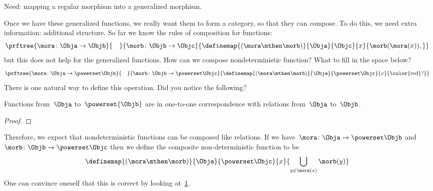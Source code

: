 Need: mapping a regular morphism into a generalized morphism.

Once we have these generalized functions, we really want them to form a category, so that they can compose.
To do this, we need extra information: additional structure.
So far we know the rules of composition for functions:
%
\begin{equation}
    \label{eq:monad-function-composition}
    \prftree{\mora\colon \Obja \to \Objb}{\quad}{\morb\colon \Objb \to \Objc}
    {\definemap{(\mora\mthen\morb)}{\Obja}{\Objc}%
        {x}{\morb(\mora(x)),}}
\end{equation}
%
but this does not help for the generalized functions.
How can we compose nondeterministic function?
What to fill in the space below?
%
\begin{equation}
    \label{eq:monad-gen-function-composition}
    \prftree{\mora\colon \Obja \to \powerset\Objb}{\quad}{\morb\colon \Objb \to \powerset \Objc}
    {\definemap{(\mora\mthen\morb)}{\Obja}{\powerset\Objc}%
        {x}{\text{\color{red}?}}}
\end{equation}
%
There is one natural way to define this operation.
Did you notice the following?

\begin{lemma}
    \label{lem:powersets-relations}
    Functions from~$\Obja$ to~$\powerset{\Objb}$ are in one-to-one correspondence with relations from~$\Obja$ to~$\Objb$.
\end{lemma}

\begin{proof}
\end{proof}

Therefore, we expect that nondeterministic functions can be composed like relations.
If we have~$\mora\colon \Obja \to \powerset\Objb$ and~$\morb\colon \Objb \to \powerset \Objc$ then we define the composite non-deterministic function to be
%
\begin{equation}
    \label{eq:fish-nondet}
    \definemap{(\mora\mthen\morb)}{\Obja}{\powerset\Objc}%
    {x}{ \displaystyle \bigcup_{y\in \mora(x)}\morb(y)}
\end{equation}
%
One can convince oneself that this is correct by looking at~\cref{fig:mapping-nondeterministic}.

\begin{figure}[h]
    \caption{}
    \label{fig:mapping-nondeterministic}
\end{figure}

